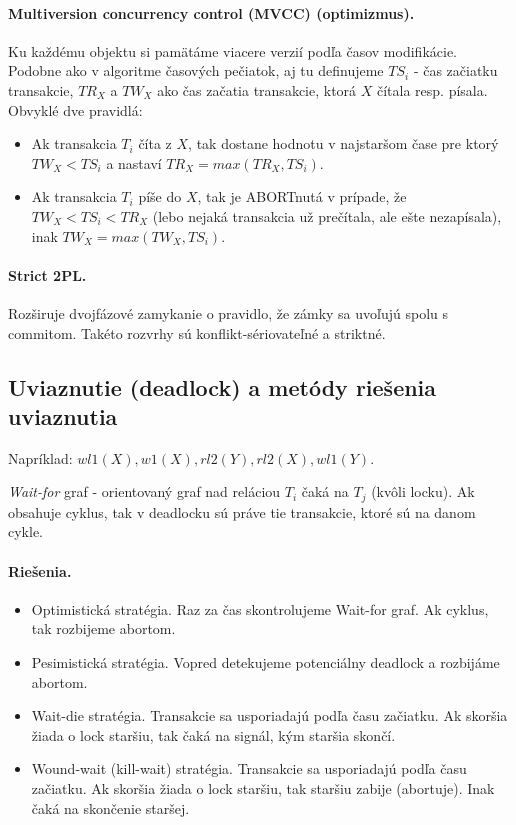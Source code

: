 \documentclass[10pt,a4paper]{article}
\begin{document}
\paragraph{Multiversion concurrency control (MVCC) (optimizmus).}
Ku každému objektu si pamätáme viacere verzií podľa časov modifikácie.
Podobne ako v algoritme časových pečiatok, aj tu definujeme $TS_i$ - čas začiatku transakcie, $TR_X$ a $TW_X$ ako čas začatia transakcie, ktorá $X$ čítala resp. písala. Obvyklé dve pravidlá: 

\begin{itemize}
\item Ak transakcia $T_i$ číta z $X$, tak dostane hodnotu v najstaršom čase pre ktorý $TW_X < TS_i$ a nastaví $TR_X = max(TR_X, TS_i)$.
\item Ak transakcia $T_i$ píše do $X$, tak je ABORTnutá v prípade, že $TW_X < TS_i < TR_X$ (lebo nejaká transakcia už prečítala, ale ešte nezapísala), inak $TW_X = max(TW_X, TS_i)$.
\end{itemize}

\paragraph{Strict 2PL.}
Rozširuje dvojfázové zamykanie o pravidlo, že zámky sa uvoľujú spolu s commitom. Takéto rozvrhy sú konflikt-sériovateľné a striktné. 


\subsection{Uviaznutie (deadlock) a metódy riešenia uviaznutia}
Napríklad: $wl1(X), w1(X), rl2(Y), rl2(X), wl1(Y)$.

\emph{Wait-for} graf - orientovaný graf nad reláciou $T_i$ čaká na $T_j$ (kvôli locku).
Ak obsahuje cyklus, tak v deadlocku sú práve tie transakcie, ktoré sú na danom cykle. 

\paragraph{Riešenia.}

\begin{itemize}
\item Optimistická stratégia. Raz za čas skontrolujeme Wait-for graf. Ak cyklus, tak rozbijeme abortom. 
\item Pesimistická stratégia. Vopred detekujeme potenciálny deadlock a rozbijáme abortom.  
\item Wait-die stratégia. Transakcie sa usporiadajú podľa času začiatku. Ak skoršia žiada o lock staršiu, tak čaká na signál, kým staršia skončí. 
\item Wound-wait (kill-wait) stratégia. Transakcie sa usporiadajú podľa času začiatku. Ak skoršia žiada o lock staršiu, tak staršiu zabije (abortuje). Inak čaká na skončenie staršej. 
\end{itemize}
\end{document}
